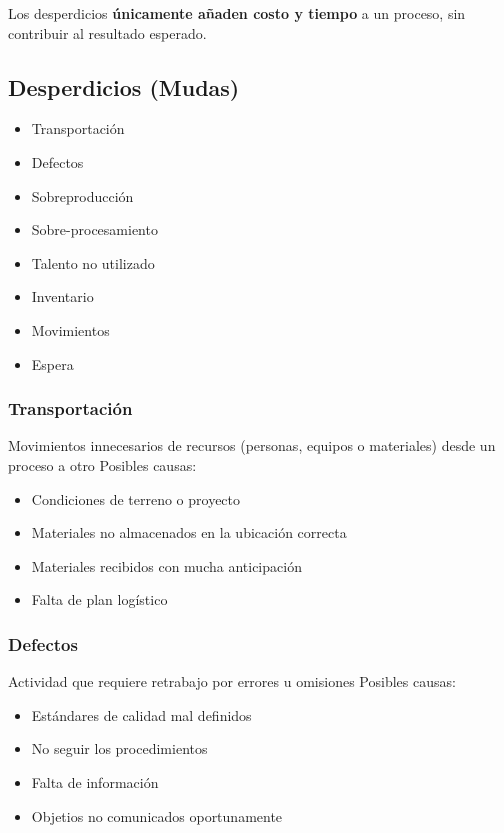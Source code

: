 \vspace{0.3cm}

\noindent Los desperdicios \textbf{únicamente añaden costo y tiempo} a un proceso, sin contribuir al resultado esperado.

\subsection*{Desperdicios (Mudas)}

\begin{itemize}
    \item Transportación
    \item Defectos
    \item Sobreproducción
    \item Sobre-procesamiento
    \item Talento no utilizado
    \item Inventario
    \item Movimientos 
    \item Espera
\end{itemize}

\subsubsection*{Transportación}
Movimientos innecesarios de recursos (personas, equipos o materiales) desde un proceso a otro
Posibles causas:
\begin{itemize}
    \item Condiciones de terreno o proyecto
    \item Materiales no almacenados en la ubicación correcta
    \item Materiales recibidos con mucha anticipación
    \item Falta de plan logístico
\end{itemize}

\subsubsection*{Defectos}
Actividad que requiere retrabajo por errores u omisiones
Posibles causas:
\begin{itemize}
    \item Estándares de calidad mal definidos
    \item No seguir los procedimientos
    \item Falta de información
    \item Objetios no comunicados oportunamente   
\end{itemize}


